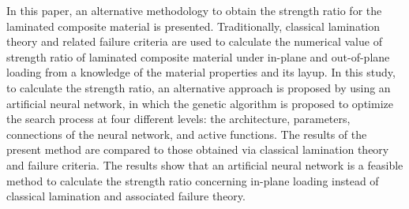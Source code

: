 In this paper, an alternative methodology to obtain the strength ratio for the
laminated composite material is presented. Traditionally, classical lamination
theory and related failure criteria are used to calculate the numerical value of
strength ratio of laminated composite material under in-plane and out-of-plane
loading from a knowledge of the material properties and its layup. In this
study, to calculate the strength ratio, an alternative approach is proposed by
using an artificial neural network, in which the genetic algorithm is proposed
to optimize the search process at four different levels: the architecture,
parameters, connections of the neural network, and active functions. The results
of the present method are compared to those obtained via classical lamination
theory and failure criteria. The results show that an artificial neural network
is a feasible method to calculate the strength ratio concerning in-plane loading
instead of classical lamination and associated failure theory.
